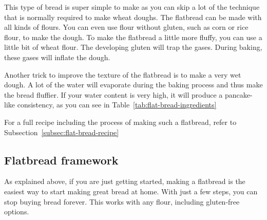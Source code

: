 This type of bread is super simple to make as you can skip
a lot of the technique that is normally required to make wheat doughs.
The flatbread can be made with all kinds of flours. You can even use
flour without gluten, such as corn or rice flour, to make the
dough. To make the flatbread a little more fluffy, you
can use a little bit of wheat flour. The developing gluten
will trap the gases. During baking, these gases will
inflate the dough.

Another trick to improve the texture of the flatbread is to
make a very wet dough. A lot of the water will evaporate
during the baking process and thus make the bread fluffier.
If your water content is very high, it will produce a
pancake-like consistency, as you can see in
Table~\ref{tab:flat-bread-ingredients}

\begin{table}[!htb]
    \centering
        
        \caption[Flatbread recipe]{Flatbread or pancake recipe for 1 person.
            Multiply the ingredients to increase portion size.  Refer to the
            Section~\ref{sec:bakers-math}
            ``'' to learn how to understand and
            use the percentages properly.}%
            \label{tab:flat-bread-ingredients}
\end{table}

For a full recipe including the process of making such a flatbread,   refer to
Subsection~\ref{subsec:flat-bread-recipe}

\subsection{Flatbread framework}%
\label{subsec:flat-bread-framework}

As explained above, if you are just getting started, making a flatbread is the
easiest way to start making great bread at home. With just a
few steps, you can stop buying bread forever. This works with
any flour, including gluten-free options.

\begin{flowchart}[!htb]
\centering
  
  \caption[The process to make a sourdough flatbread]{The process of making a flatbread is very
      simple, requiring very little effort. This type of bread is especially
      handy for busy bakers.}%
  \label{fig:flat-bread-process}
\end{flowchart}

